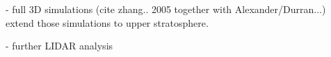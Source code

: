 



- full 3D simulations (cite zhang.. 2005 together with Alexander/Durran...) extend those simulations to upper stratosphere.

- further LIDAR analysis


